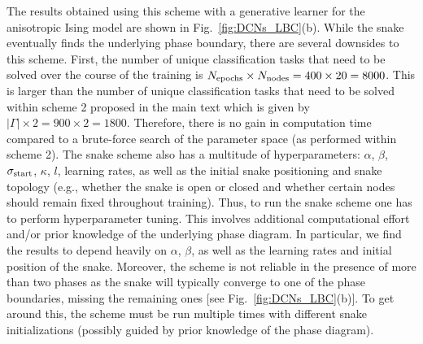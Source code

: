 \documentclass[twocolumn,aps,pra,superscriptaddress,tightlines,nofootinbib]{revtex4-2}
\begin{document}
	The results obtained using this scheme with a generative learner for the anisotropic Ising model are shown in Fig.~\ref{fig:DCNs_LBC}(b). While the snake eventually finds the underlying phase boundary, there are several downsides to this scheme. First, the number of unique classification tasks that need to be solved over the course of the training is $N_{\rm epochs} \times N_{\rm nodes} = 400 \times 20 = 8000$. This is larger than the number of unique classification tasks that need to be solved within scheme 2 proposed in the main text which is given by $|\Gamma| \times 2 = 900 \times 2 = 1800$. Therefore, there is no gain in computation time compared to a brute-force search of the parameter space (as performed within scheme 2). The snake scheme also has a multitude of hyperparameters: $\alpha$, $\beta$, $\sigma_{\rm start}$, $\kappa$, $l$, learning rates, as well as the initial snake positioning and snake topology (e.g., whether the snake is open or closed and whether certain nodes should remain fixed throughout training). Thus, to run the snake scheme one has to perform hyperparameter tuning. This involves additional computational effort and/or prior knowledge of the underlying phase diagram. In particular, we find the results to depend heavily on $\alpha$, $\beta$, as well as the learning rates and initial position of the snake. Moreover, the scheme is not reliable in the presence of more than two phases as the snake will typically converge to one of the phase boundaries, missing the remaining ones [see Fig.~\ref{fig:DCNs_LBC}(b)]. To get around this, the scheme must be run multiple times with different snake initializations (possibly guided by prior knowledge of the phase diagram).\\  
	
\end{document}
